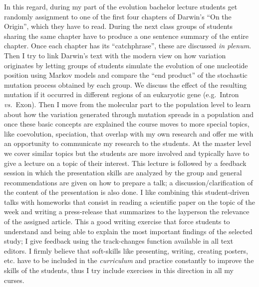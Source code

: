 \documentclass[a4paper,11pt]{article}
\begin{document}
In this regard, during my part of the evolution bachelor lecture students get randomly assignment to one of the first four chapters of Darwin's ``On the Origin'', which they have to read. During the next class groups of students sharing the same chapter have to produce a one sentence summary of the entire chapter. Once each chapter has its ``catchphrase'', these are discussed \emph{in plenum}. Then I try to link Darwin's text with the modern view on how variation originates by letting groups of students simulate the evolution of one nucleotide position using Markov models and compare the ``end product'' of the stochastic mutation process obtained by each group. We discuss the effect of the resulting mutation if it occurred in different regions of an eukaryotic gene (e.g.~Intron \emph{vs.}~Exon). Then I move from the molecular part to the population level to learn about how the variation generated through mutation spreads in a population and once these basic concepts are explained the course moves to more special topics, like coevolution, speciation, that overlap with my own research and offer me with an opportunity to communicate my research to the students. At the master level we cover similar topics but the students are more involved and typically have to give a lecture on a topic of their interest. This lecture is followed by a feedback session in which the presentation skills are analyzed by the group and general recommendations are given on how to prepare a talk; a discussion/clarification of the content of the presentation is also done. I like combining this student-driven talks with homeworks that consist in reading a scientific paper on the topic of the week and writing a press-release that summarizes to the layperson the relevance of the assigned article. This a good writing exercise that force students to understand and being able to explain the most important findings of the selected study; I give feedback using the track-changes function available in all text editors. I firmly believe that soft-skills like presenting, writing, creating posters, etc. have to be included in the \emph{curriculum} and practice constantly to improve the skills of the students, thus I try include exercises in this direction in all my curses.\\
\end{document}
